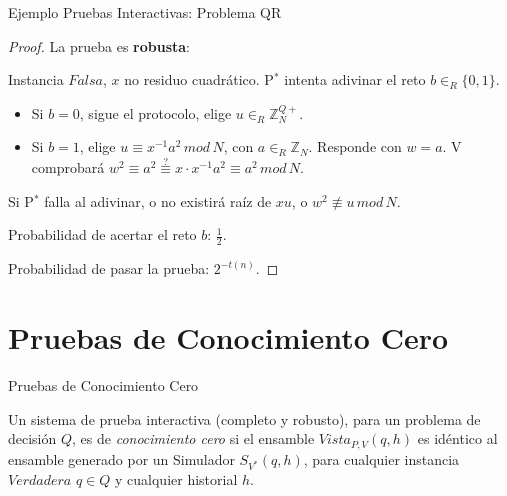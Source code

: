 \documentclass{beamer}
\begin{document}
\begin{frame}{Ejemplo Pruebas Interactivas: Problema QR}
\begin{proof}
	La prueba es \textbf{robusta}:
	
	Instancia $Falsa$, $x$ no residuo cuadrático.
	P$^*$ intenta adivinar el reto $b\in_R\{0,1\}$.
	\begin{itemize}
		\item Si $b=0$, sigue el protocolo, elige $u \in_R \mathbb{Z}^{Q+}_N$.
		
		\item Si $b=1$, elige $u \equiv x^{-1} a^2 \, mod \, N$, con $a \in_R \mathbb{Z}_N$.
		Responde con $w = a$.		
		V comprobará $w^2\equiv a^2 \overset{?}{\equiv} x\cdot x^{-1} a^2 \equiv a^2 \, mod \, N$.
	\end{itemize}

	Si P$^*$ falla al adivinar, o no existirá raíz de $xu$, o $w^2 \not \equiv u \, mod \, N$.
	
	Probabilidad de acertar el reto $b$: $\frac{1}{2}$.
	
	Probabilidad de pasar la prueba: $2^{-t(n)}$.
	
\end{proof}
\end{frame}



\section{Pruebas de Conocimiento Cero}

\begin{frame}{Pruebas de Conocimiento Cero}
	\begin{definition}
		Un sistema de prueba interactiva (completo y robusto), para un problema de decisión $Q$, es de \textit{conocimiento cero} si el ensamble $Vista_{P,V}(q,h)$ es idéntico al ensamble generado por un Simulador $S_{V^*}(q,h)$, para cualquier instancia $Verdadera$ $q\in Q$ y cualquier historial $h$.
	\end{definition}
\end{frame}
\end{document}
